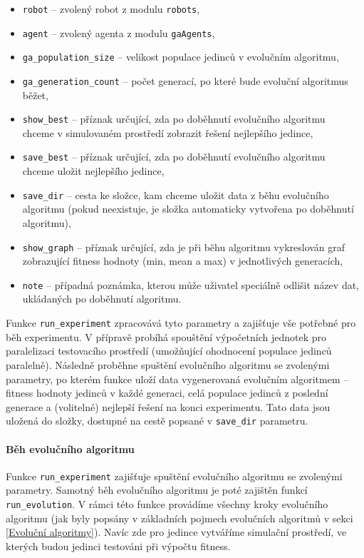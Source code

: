 \begin{itemize}
    \item \texttt{robot} -- zvolený robot z modulu \texttt{robots},
    \item \texttt{agent} -- zvolený agenta z modulu \texttt{gaAgents},
    \item \texttt{ga\_population\_size} -- velikost populace jedinců v
        evolučním algoritmu,
    \item \texttt{ga\_generation\_count} -- počet generací, po které bude
        evoluční algoritmus běžet,
    \item \texttt{show\_best} -- příznak určující, zda po doběhnutí evolučního
        algoritmu \\chceme v simulovaném prostředí zobrazit řešení nejlepšího
        jedince,
    \item \texttt{save\_best} -- příznak určující, zda po doběhnutí evolučního
        algoritmu \\chceme uložit nejlepšího jedince,
    \item \texttt{save\_dir} -- cesta ke složce, kam chceme uložit data z běhu
        evolučního algoritmu (pokud neexistuje, je složka automaticky vytvořena
        po doběhnutí algoritmu),
    \item \texttt{show\_graph} -- příznak určující, zda je při běhu algoritmu
        vykreslován graf zobrazující fitness hodnoty (min, mean a max) v
        jednotlivých generacích,
    \item \texttt{note} -- případná poznámka, kterou může uživatel speciálně
        odlišit název dat, ukládaných po doběhnutí algoritmu.
\end{itemize}

Funkce \texttt{run\_experiment} zpracovává tyto parametry a zajišťuje vše
potřebné pro běh experimentu. V přípravě probíhá spouštění výpočetních
jednotek pro paralelizaci testovacího prostředí (umožňující ohodnocení
populace jedinců paralelně). Následně proběhne spuštění evolučního algoritmu se
zvolenými parametry, po kterém funkce uloží data vygenerovaná evolučním
algoritmem -- fitness hodnoty jedinců v každé generaci, celá
populace jedinců z poslední generace a (volitelné) nejlepší řešení na konci
experimentu. Tato data jsou uložená do složky, dostupné na cestě popsané v
\texttt{save\_dir} parametru.

\paragraph{Běh evolučního algoritmu}
Funkce \texttt{run\_experiment} zajišťuje spuštění evolučního algoritmu se
zvolenými parametry. Samotný běh evolučního algoritmu je poté zajištěn funkcí
\texttt{run\_evolution}. V rámci této funkce provádíme všechny kroky evolučního
algoritmu (jak byly popsány v základních pojmech evolučních algoritmů v sekci
\ref{Evoluční algoritmy}). Navíc zde pro jedince vytváříme simulační prostředí,
ve kterých budou jedinci testováni při výpočtu fitness.

